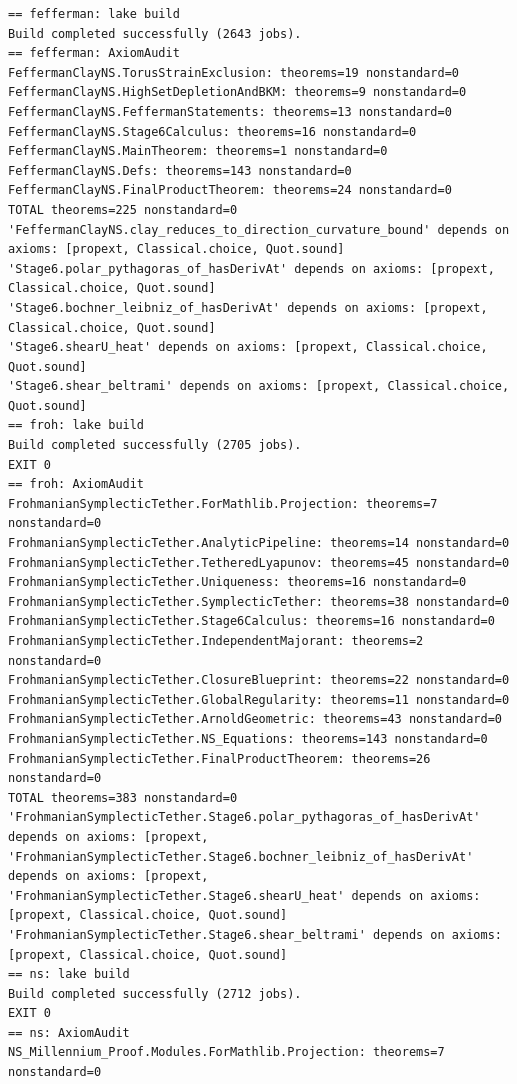 \documentclass[11pt]{article}
\begin{document}
\begin{scriptsize}\begin{verbatim}
== fefferman: lake build
Build completed successfully (2643 jobs).
== fefferman: AxiomAudit
FeffermanClayNS.TorusStrainExclusion: theorems=19 nonstandard=0
FeffermanClayNS.HighSetDepletionAndBKM: theorems=9 nonstandard=0
FeffermanClayNS.FeffermanStatements: theorems=13 nonstandard=0
FeffermanClayNS.Stage6Calculus: theorems=16 nonstandard=0
FeffermanClayNS.MainTheorem: theorems=1 nonstandard=0
FeffermanClayNS.Defs: theorems=143 nonstandard=0
FeffermanClayNS.FinalProductTheorem: theorems=24 nonstandard=0
TOTAL theorems=225 nonstandard=0
'FeffermanClayNS.clay_reduces_to_direction_curvature_bound' depends on axioms: [propext, Classical.choice, Quot.sound]
'Stage6.polar_pythagoras_of_hasDerivAt' depends on axioms: [propext, Classical.choice, Quot.sound]
'Stage6.bochner_leibniz_of_hasDerivAt' depends on axioms: [propext, Classical.choice, Quot.sound]
'Stage6.shearU_heat' depends on axioms: [propext, Classical.choice, Quot.sound]
'Stage6.shear_beltrami' depends on axioms: [propext, Classical.choice, Quot.sound]
== froh: lake build
Build completed successfully (2705 jobs).
EXIT 0
== froh: AxiomAudit
FrohmanianSymplecticTether.ForMathlib.Projection: theorems=7 nonstandard=0
FrohmanianSymplecticTether.AnalyticPipeline: theorems=14 nonstandard=0
FrohmanianSymplecticTether.TetheredLyapunov: theorems=45 nonstandard=0
FrohmanianSymplecticTether.Uniqueness: theorems=16 nonstandard=0
FrohmanianSymplecticTether.SymplecticTether: theorems=38 nonstandard=0
FrohmanianSymplecticTether.Stage6Calculus: theorems=16 nonstandard=0
FrohmanianSymplecticTether.IndependentMajorant: theorems=2 nonstandard=0
FrohmanianSymplecticTether.ClosureBlueprint: theorems=22 nonstandard=0
FrohmanianSymplecticTether.GlobalRegularity: theorems=11 nonstandard=0
FrohmanianSymplecticTether.ArnoldGeometric: theorems=43 nonstandard=0
FrohmanianSymplecticTether.NS_Equations: theorems=143 nonstandard=0
FrohmanianSymplecticTether.FinalProductTheorem: theorems=26 nonstandard=0
TOTAL theorems=383 nonstandard=0
'FrohmanianSymplecticTether.Stage6.polar_pythagoras_of_hasDerivAt' depends on axioms: [propext,
'FrohmanianSymplecticTether.Stage6.bochner_leibniz_of_hasDerivAt' depends on axioms: [propext,
'FrohmanianSymplecticTether.Stage6.shearU_heat' depends on axioms: [propext, Classical.choice, Quot.sound]
'FrohmanianSymplecticTether.Stage6.shear_beltrami' depends on axioms: [propext, Classical.choice, Quot.sound]
== ns: lake build
Build completed successfully (2712 jobs).
EXIT 0
== ns: AxiomAudit
NS_Millennium_Proof.Modules.ForMathlib.Projection: theorems=7 nonstandard=0

\end{verbatim}
\end{scriptsize}
\end{document}
